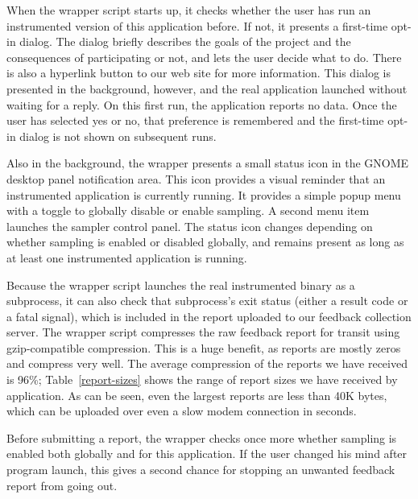 \documentclass[times,10pt,twocolumn]{article}
\begin{document}
When the wrapper script starts up, it checks whether the user has run
an instrumented version of this application before.  If not, it
presents a first-time opt-in dialog.  The dialog briefly describes the
goals of the project and the consequences of participating or not, and
lets the user decide what to do.  There is also a hyperlink button to
our web site for more information.  This dialog is presented in the
background, however, and the real application launched without waiting
for a reply.  On this first run, the application 
reports no data.  
Once the user has selected yes or no, that preference is
remembered and the first-time opt-in dialog is not shown on subsequent
runs.

Also in the background, the wrapper presents a small status icon in
the GNOME desktop panel notification area.  This icon provides a
visual reminder that an instrumented application is currently running.
It provides a simple popup menu with a toggle to globally disable or
enable sampling.  A second menu item launches the sampler control
panel.  The status icon changes depending on whether sampling is
enabled or disabled globally, and remains present as long as at least
one instrumented application is running.  

Because the wrapper script launches the real instrumented binary as a
subprocess, it can also check that subprocess's exit status (either a
result code or a fatal signal), which is included in the report
uploaded to our feedback collection server.
The wrapper script compresses the raw feedback report for transit
using gzip-compatible compression.  This is a huge benefit, as reports
are mostly zeros and compress very well.  The average compression
of the reports we have received is 96\%; Table~\ref{report-sizes} shows
the range of report sizes we have received by application.  As can be
seen, even the largest reports are less than 40K bytes, which can be uploaded
over even a slow modem connection in seconds.

Before submitting a report, the wrapper checks once more whether
sampling is enabled both globally and for this application.  If the
user changed his mind after program launch, this gives a second chance
for stopping an unwanted feedback report from going out.
\end{document}
